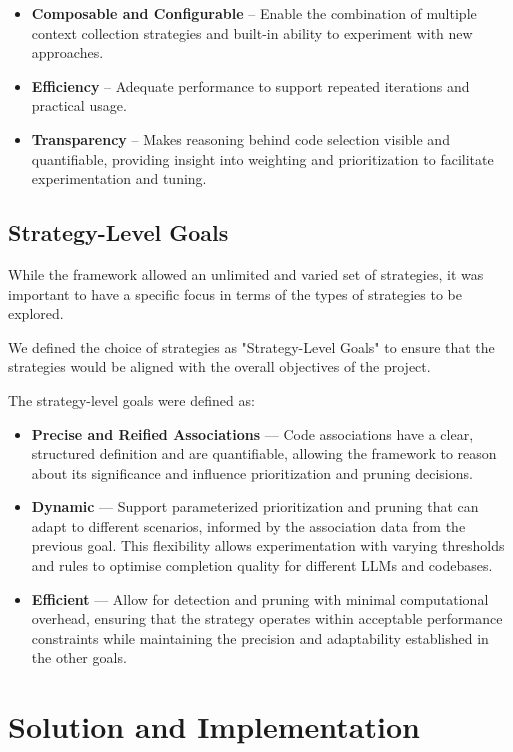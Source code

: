 \documentclass[conference]{IEEEtran}
\begin{document}
\begin{itemize}
    \item \textbf{Composable and Configurable} -- Enable the combination of multiple context collection strategies 
    and built-in ability to experiment with new approaches.
    \item \textbf{Efficiency} -- Adequate performance to support repeated iterations and practical usage.
    \item \textbf{Transparency} -- Makes reasoning behind code selection visible and quantifiable, 
    providing insight into weighting and prioritization to facilitate experimentation and tuning.
\end{itemize}


\subsection{Strategy-Level Goals}
While the framework allowed an unlimited and varied set of strategies, it was important to have a specific focus in 
terms of the types of strategies to be explored.

We defined the choice of strategies as "Strategy-Level Goals" to ensure that the strategies would be aligned with the 
overall objectives of the project.

The strategy-level goals were defined as:
\begin{itemize}
\item \textbf{Precise and Reified Associations} — Code associations have a clear, structured definition and are quantifiable, 
allowing the framework to reason about its significance and influence prioritization and pruning decisions.

\item \textbf{Dynamic} — Support parameterized prioritization and pruning that can adapt to different scenarios, informed by the association data from the previous goal. This flexibility allows experimentation with varying thresholds and 
rules to optimise completion quality for different LLMs and codebases.

\item \textbf{Efficient} — Allow for detection and pruning with minimal computational overhead, 
ensuring that the strategy operates within acceptable performance constraints while maintaining the 
precision and adaptability established in the other goals.
\end{itemize}



\section{Solution and Implementation}
\end{document}
